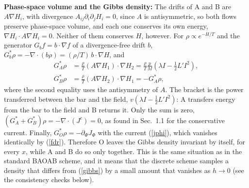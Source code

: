 \documentclass[11pt]{article}
\begin{document}
{\bf Phase-space volume and the Gibbs density:} The drifts of A and B are $A\nabla H_i$, with divergence $A_{ij}\partial_i\partial_jH_i=0$, since $A$ is antisymmetric, so both flows preserve phase-space volume, and each one conserves its own energy, $\nabla H_i\cdot A\nabla H_i=0$. Neither of them conserves $H$, however. For $\rho\propto e^{-H/T}$ and the generator $G_bf=b\cdot\nabla f$ of a divergence-free drift $b$, $G_b^*\rho=-\nabla\cdot(b\rho)=(\rho/T)\,b\cdot\nabla H$, and
\begin{align}
  G_A^*\rho&=\frac{\rho}{T}(A\nabla H_1)\cdot\nabla H_2=\frac{\rho}{T}\frac{p}{M}\left(\lambda I-\frac{1}{2}L'I^2\right),\nonumber\\
  G_B^*\rho&=\frac{\rho}{T}(A\nabla H_2)\cdot\nabla H_1=-G_A^*\rho,
\end{align}
where the second equality uses the antisymmetry of $A$. The bracket is the power transferred between the bar and the field, $v(\lambda I-\frac{1}{2}L'I^2)$: A transfers energy from the bar to the field and B returns it. Only the sum is zero, $(G_A^*+G_B^*)\rho=-\nabla\cdot(J^c)=0$, as found in Sec.~1.1 for the conservative current. Finally, $G_O^*\rho=-\partial_\Phi J_\Phi$ with the current (\ref{jphi}), which vanishes identically by (\ref{fdr}). Therefore O leaves the Gibbs density invariant by itself, for every $x$, while A and B do so only together. This is the same situation as in the standard BAOAB scheme, and it means that the discrete scheme samples a density that differs from (\ref{gibbs}) by a small amount that vanishes as $h\to0$ (see the consistency checks below).
\end{document}

